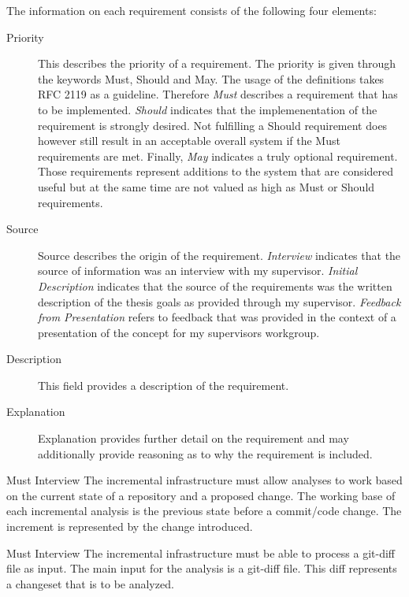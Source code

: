 \documentclass[a4paper]{article}
\begin{document}
The information on each requirement consists of the following four elements:

\begin{description}
    \item [Priority]
	This describes the priority of a requirement. The priority is given through the keywords Must, Should and May. The usage of the definitions takes RFC 2119 \cite{RFC-bum} as a guideline. Therefore \emph{Must} describes a requirement that has to be implemented. \emph{Should} indicates that the implemenentation of the requirement is strongly desired. Not fulfilling a Should requirement  does however still result in an acceptable overall system if the Must requirements are met. Finally, \emph{May} indicates a truly optional requirement. Those requirements represent additions to the system that are considered useful but at the same time are not valued as high as Must or Should requirements.
    \item [Source]
    Source describes the origin of the requirement. \emph{Interview} indicates that the source of information was an interview with my supervisor. \emph{Initial Description} indicates that the source of the requirements was the written description of the thesis goals as provided through my supervisor. \emph{Feedback from Presentation} refers to feedback that was provided in the context of a presentation of the concept for my supervisors workgroup.
    \item [Description]
    This field provides a description of the requirement.
    \item [Explanation]
    Explanation provides further detail on the requirement and may additionally provide reasoning as to why the requirement is included.
\end{description}
\vspace{2em}


\begin{req} \label{req:working-base}
	\reqtable
	{Must}  {Interview}
	{The incremental infrastructure must allow analyses to work based on the current state of a repository and a proposed change.}
	{The working base of each incremental analysis is the previous state before a commit/code change. The increment is represented by the change introduced.}
	\vspace{1em}

	\begin{subreq} \label{req:git-diff}
		\reqtable
		{Must}  {Interview}
		{The incremental infrastructure must be able to process a git-diff file as input.}
		{The main input for the analysis is a git-diff file. This diff represents a changeset that is to be analyzed.}
	\end{subreq}
\end{req}
\vspace{1em}
\end{document}
